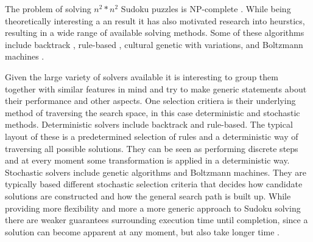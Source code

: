 \documentclass[a4paper,11pt]{kth-mag}
\begin{document}
The problem of solving $n^2 * n^2$ Sudoku puzzles is NP-complete \cite{complexity}.
While being theoretically interesting a an result it has also motivated research into heurstics, resulting in a wide range of available solving methods.
Some of these algorithms include backtrack \cite{searchBased}, rule-based \cite{techniques}, cultural genetic with variations\cite{stochastic}, and Boltzmann machines \cite{boltzmann}.

Given the large variety of solvers available it is interesting to group them together with similar features in mind and try to make generic statements about their performance and other aspects.
One selection critiera is their underlying method of traversing the search space, in this case deterministic and stochastic methods.
Deterministic solvers include backtrack and rule-based.
The typical layout of these is a predetermined selection of rules and a deterministic way of traversing all possible solutions.
They can be seen as performing discrete steps and at every moment some transformation is applied in a deterministic way.
Stochastic solvers include genetic algorithms and Boltzmann machines.
They are typically based different stochastic selection criteria that decides how candidate solutions are constructed and how the general search path is built up.
While providing more flexibility and more a more generic approach to Sudoku solving there are weaker guarantees surrounding execution time until completion, since a solution can become apparent at any moment, but also take longer time \cite{stochastic}.
\end{document}
